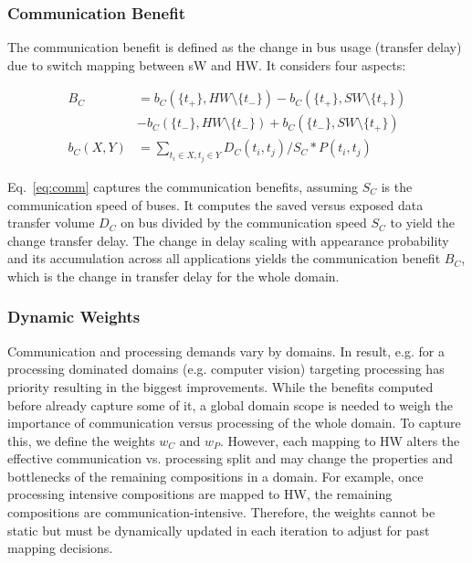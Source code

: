 \subsubsection{Communication Benefit}
\label{sub:ben_comm}
The communication benefit is defined as the change in bus usage (transfer delay) due to switch mapping between sW and HW. It considers four aspects:  

\begingroup\makeatletter{}\check@mathfonts
\begin{equation}
\begin{split}
\label{eq:comm}
    B_{C} &=  b_{C}(\{t_{+}\}, HW \setminus \{t_{-}\}) - b_{C}(\{t_{+}\}, SW \setminus \{t_{+}\}) \\
        &- b_{C}(\{t_{-}\}, HW \setminus \{t_{-}\}) + b_{C}(\{t_{-}\}, SW \setminus \{t_{+}\}) \\
    b_{C}(X, Y) &= \sum_{ t_{i} \in X, t_{j} \in Y } D_{C}(t_{i},t_{j}) / S_{C} * P(t_{i},t_{j})
\end{split}
\end{equation}
\endgroup

Eq.~\eqref{eq:comm} captures the communication benefits, assuming $S_C$ is the communication speed of buses. It computes the saved versus exposed data transfer volume $D_C$ on bus divided by the communication speed $S_C$ to yield the change transfer delay. The change in delay scaling with appearance probability and its accumulation across all applications yields the communication benefit $B_C$, which is the change in transfer delay for the whole domain.


\subsubsection{Dynamic Weights}
\label{sub:weight}
Communication and processing demands vary by domains. In result, e.g. for a processing dominated domains (e.g. computer vision) targeting processing has priority resulting in the biggest improvements. While the benefits computed before already capture some of it, a global domain scope is needed to weigh the importance of communication versus processing of the whole domain. To capture this, we define the weights $w_C$ and $w_P$. 
However, each mapping to HW alters the effective communication vs. processing split and may change the properties and bottlenecks of the remaining compositions in a domain. For example, once processing intensive compositions are mapped to HW, the remaining compositions are communication-intensive. Therefore, the weights cannot be static but must be dynamically updated in each iteration to adjust for past mapping decisions.

